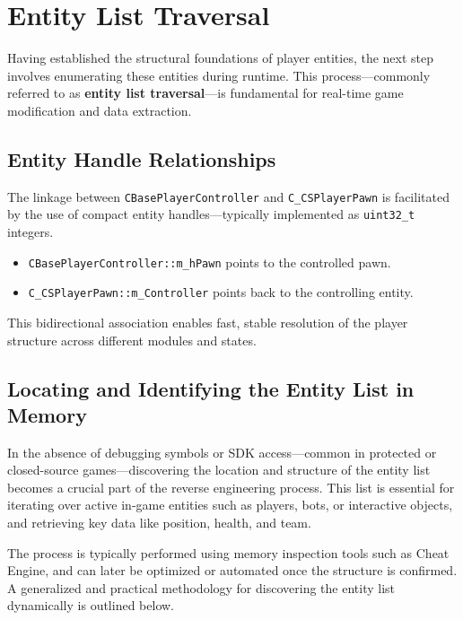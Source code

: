         

\section{Entity List Traversal}

Having established the structural foundations of player entities, the next step involves enumerating these entities during runtime. This process—commonly referred to as \textbf{entity list traversal}—is fundamental for real-time game modification and data extraction.


\subsection{Entity Handle Relationships}

The linkage between \texttt{CBasePlayerController} and \texttt{C\_CSPlayerPawn} is facilitated by the use of compact entity handles—typically implemented as \texttt{uint32\_t} integers.

\begin{itemize}
    \item \texttt{CBasePlayerController::m\_hPawn} points to the controlled pawn.
    \item \texttt{C\_CSPlayerPawn::m\_Controller} points back to the controlling entity.
\end{itemize}

This bidirectional association enables fast, stable resolution of the player structure across different modules and states.

\subsection{Locating and Identifying the Entity List in Memory}

In the absence of debugging symbols or SDK access—common in protected or closed-source games—discovering the location and structure of the entity list becomes a crucial part of the reverse engineering process. This list is essential for iterating over active in-game entities such as players, bots, or interactive objects, and retrieving key data like position, health, and team.

The process is typically performed using memory inspection tools such as Cheat Engine, and can later be optimized or automated once the structure is confirmed. A generalized and practical methodology for discovering the entity list dynamically is outlined below.

